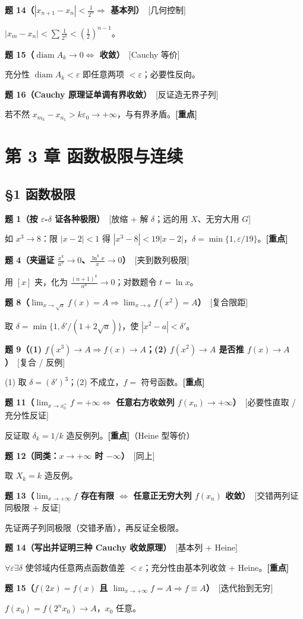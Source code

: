\documentclass[11pt,a4paper,UTF8]{ctexart}
\newcommand{\eps}{\varepsilon}
\newcommand{\p}[2]{\par\smallskip\noindent\textbf{#1}\ \textcolor{blue!55!black}{[#2]}\par\nopagebreak}
\begin{document}
\p{题 14（$|x_{n+1}-x_n|<\frac1{2^n}\Rightarrow$ 基本列）}{几何控制}
$|x_m-x_n|<\sum\frac1{2^k}<(\frac12)^{n-1}$。

\p{题 15（$\operatorname{diam}A_k\to0\iff$ 收敛）}{Cauchy 等价}
充分性 $\operatorname{diam}A_k<\eps$ 即任意两项 $<\eps$；必要性反向。

\p{题 16（Cauchy 原理证单调有界收敛）}{反证造无界子列}
若不然 $x_{m_k}-x_{n_1}>k\eps_0\to+\infty$，与有界矛盾。\textbf{[重点]}

\section{第 3 章 函数极限与连续}

\subsection*{§1 函数极限}
\p{题 1（按 $\eps$-$\delta$ 证各种极限）}{放缩 + 解 $\delta$；远的用 $X$、无穷大用 $G$}
如 $x^3\to8$：限 $|x-2|<1$ 得 $|x^3-8|<19|x-2|$，$\delta=\min\{1,\eps/19\}$。\textbf{[重点]}

\p{题 4（夹逼证 $\frac{x^k}{a^x}\to0$、$\frac{\ln^k x}{x}\to0$）}{夹到数列极限}
用 $[x]$ 夹，化为 $\frac{(n+1)^k}{a^n}\to0$；对数题令 $t=\ln x$。

\p{题 8（$\lim_{x\to\sqrt a}f(x)=A\Rightarrow\lim_{x\to a}f(x^2)=A$）}{复合限距}
取 $\delta=\min\{1,\delta'/(1+2\sqrt a)\}$，使 $|x^2-a|<\delta'$。

\p{题 9（(1) $f(x^3)\to A\Rightarrow f(x)\to A$；(2) $f(x^2)\to A$ 是否推 $f(x)\to A$）}{复合 / 反例}
(1) 取 $\delta=(\delta')^3$；(2) 不成立，$f=$ 符号函数。\textbf{[重点]}

\p{题 11（$\lim_{x\to x_0^+}f=+\infty\iff$ 任意右方收敛列 $f(x_n)\to+\infty$）}{必要性直取 / 充分性反证}
反证取 $\delta_k=1/k$ 造反例列。\textbf{[重点]}（Heine 型等价）

\p{题 12（同类：$x\to+\infty$ 时 $-\infty$）}{同上}
取 $X_k=k$ 造反例。

\p{题 13（$\lim_{x\to+\infty}f$ 存在有限 $\iff$ 任意正无穷大列 $f(x_n)$ 收敛）}{交错两列证同极限 + 反证}
先证两子列同极限（交错矛盾），再反证全极限。

\p{题 14（写出并证明三种 Cauchy 收敛原理）}{基本列 + Heine}
$\forall\eps\exists\delta$ 使邻域内任意两点函数值差 $<\eps$；充分性由基本列收敛 + Heine。\textbf{[重点]}

\p{题 15（$f(2x)=f(x)$ 且 $\lim_{x\to+\infty}f=A\Rightarrow f\equiv A$）}{迭代抬到无穷}
$f(x_0)=f(2^nx_0)\to A$，$x_0$ 任意。
\end{document}
